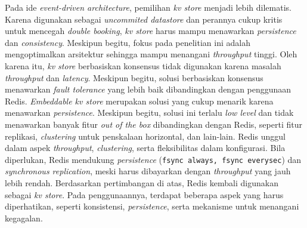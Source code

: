Pada ide \textit{event-driven architecture}, pemilihan \textit{kv store} menjadi lebih dilematis. Karena digunakan sebagai \textit{uncommited datastore} dan perannya cukup kritis untuk mencegah \textit{double booking}, \textit{kv store} harus mampu menawarkan \textit{persistence} dan \textit{consistency}. Meskipun begitu, fokus pada penelitian ini adalah mengoptimalkan arsitektur sehingga mampu menangani \textit{throughput} tinggi. Oleh karena itu, \textit{kv store} berbasiskan konsensus tidak digunakan karena masalah \textit{throughput} dan \textit{latency}. Meskipun begitu, solusi berbasiskan konsensus menawarkan \textit{fault tolerance} yang lebih baik dibandingkan dengan penggunaan Redis. \textit{Embeddable kv store} merupakan solusi yang cukup menarik karena menawarkan \textit{persistence}. Meskipun begitu, solusi ini terlalu \textit{low level} dan tidak menawarkan banyak fitur \textit{out of the box} dibandingkan dengan Redis, seperti fitur replikasi, \textit{clustering} untuk penskalaan horizontal, dan lain-lain. Redis unggul dalam aspek \textit{throughput}, \textit{clustering}, serta fleksibilitas dalam konfigurasi. Bila diperlukan, Redis mendukung \textit{persistence} (\texttt{fsync always, fsync everysec}) dan \textit{synchronous replication}, meski harus dibayarkan dengan \textit{throughput} yang jauh lebih rendah. Berdasarkan pertimbangan di atas, Redis kembali digunakan sebagai \textit{kv store}. Pada penggunaannya, terdapat beberapa aspek yang harus diperhatikan, seperti konsistensi, \textit{persistence}, serta mekanisme untuk menangani kegagalan.
